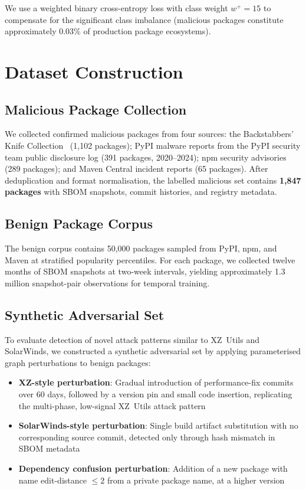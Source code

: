 \documentclass[sigconf,nonacm]{acmart}
\begin{document}
We use a weighted binary cross-entropy loss with class weight $w^+ = 15$ to
compensate for the significant class imbalance (malicious packages constitute
approximately 0.03\% of production package ecosystems).

\section{Dataset Construction}

\subsection{Malicious Package Collection}

We collected confirmed malicious packages from four sources: the Backstabbers' Knife
Collection~\cite{ohm2020backstabbers} (1,102 packages); PyPI malware reports from
the PyPI security team public disclosure log (391 packages, 2020--2024); npm
security advisories (289 packages); and Maven Central incident reports (65 packages).
After deduplication and format normalisation, the labelled malicious set contains
\textbf{1,847 packages} with SBOM snapshots, commit histories, and registry metadata.

\subsection{Benign Package Corpus}

The benign corpus contains 50,000 packages sampled from PyPI, npm, and Maven at
stratified popularity percentiles. For each package, we collected twelve months of
SBOM snapshots at two-week intervals, yielding approximately 1.3 million
snapshot-pair observations for temporal training.

\subsection{Synthetic Adversarial Set}

To evaluate detection of novel attack patterns similar to XZ~Utils and SolarWinds,
we constructed a synthetic adversarial set by applying parameterised graph
perturbations to benign packages:

\begin{itemize}
  \item \textbf{XZ-style perturbation}: Gradual introduction of performance-fix
        commits over 60 days, followed by a version pin and small code insertion,
        replicating the multi-phase, low-signal XZ~Utils attack pattern
  \item \textbf{SolarWinds-style perturbation}: Single build artifact substitution
        with no corresponding source commit, detected only through hash mismatch
        in SBOM metadata
  \item \textbf{Dependency confusion perturbation}: Addition of a new package with
        name edit-distance $\leq 2$ from a private package name, at a higher version
\end{itemize}
\end{document}

